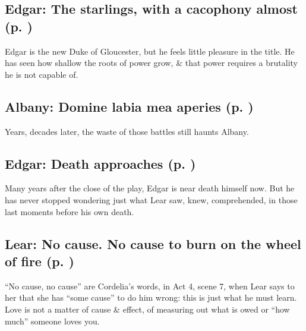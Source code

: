 \subsection{Edgar: The starlings, with a cacophony almost (p. \pageref{ch:lear_bs})}
Edgar is the new Duke of Gloucester, but he feels little pleasure in the title. He has seen how shallow the roots of power grow, \& that power requires a brutality he is not capable of.

\subsection{Albany: Domine labia mea aperies (p. \pageref{ch:lear_bt})}
Years, decades later, the waste of those battles still haunts Albany.

\subsection{Edgar: Death approaches (p. \pageref{ch:lear_bu})}
Many years after the close of the play, Edgar is near death himself now. But he has never stopped wondering just what Lear saw, knew, comprehended, in those last moments before his own death.

\subsection{Lear: No cause. No cause to burn on the wheel of fire (p. \pageref{ch:lear_bv})}
``No cause, no cause'' are Cordelia's words, in Act 4, scene 7, when Lear says to her that she has ``some cause'' to do him wrong: this is just what he must learn. Love is not a matter of cause \& effect, of measuring out what is owed or ``how much'' someone loves you.
